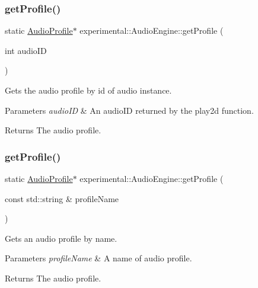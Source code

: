 \subsubsection{\texorpdfstring{get\+Profile()}{getProfile()}\hspace{0.1cm}{\footnotesize\ttfamily [2/4]}}
{\footnotesize\ttfamily static \hyperlink{classexperimental_1_1AudioProfile}{Audio\+Profile}$\ast$ experimental\+::\+Audio\+Engine\+::get\+Profile (\begin{DoxyParamCaption}\item[{int}]{audio\+ID }\end{DoxyParamCaption})\hspace{0.3cm}{\ttfamily [static]}}

Gets the audio profile by id of audio instance.


\begin{DoxyParams}{Parameters}
{\em audio\+ID} & An audio\+ID returned by the play2d function. \\
\hline
\end{DoxyParams}
\begin{DoxyReturn}{Returns}
The audio profile. 
\end{DoxyReturn}
\mbox{\label{classexperimental_1_1AudioEngine_aadf65363a78655e56c65c4153f8c5bcd}} 
\subsubsection{\texorpdfstring{get\+Profile()}{getProfile()}\hspace{0.1cm}{\footnotesize\ttfamily [3/4]}}
{\footnotesize\ttfamily static \hyperlink{classexperimental_1_1AudioProfile}{Audio\+Profile}$\ast$ experimental\+::\+Audio\+Engine\+::get\+Profile (\begin{DoxyParamCaption}\item[{const std\+::string \&}]{profile\+Name }\end{DoxyParamCaption})\hspace{0.3cm}{\ttfamily [static]}}

Gets an audio profile by name.


\begin{DoxyParams}{Parameters}
{\em profile\+Name} & A name of audio profile. \\
\hline
\end{DoxyParams}
\begin{DoxyReturn}{Returns}
The audio profile. 
\end{DoxyReturn}
\mbox{\label{classexperimental_1_1AudioEngine_aadf65363a78655e56c65c4153f8c5bcd}} 
